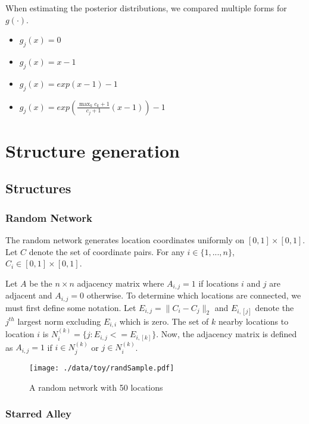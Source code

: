 \documentclass[11pt]{article}
\begin{document}
When estimating the posterior distributions, we compared multiple
forms for $g(\cdot)$.
\begin{itemize}
  \item $g_j(x) = 0$
  \item $g_j(x) = x - 1$
  \item $g_j(x) = exp(x - 1) - 1$
  \item $g_j(x) = exp(\frac{\max_k c_k+1}{c_j + 1}(x - 1)) - 1$
\end{itemize}


\section{Structure generation}
\label{sec-3}

\subsection{Structures}
\label{sec-3-1}

\subsubsection{Random Network}
\label{sec-3-1-1}

The random network generates location coordinates uniformly on $[0,1]
\times [0,1]$.  Let $C$ denote the set of coordinate pairs.  For any
$i \in \lbrace 1,...,n \rbrace$, $C_{i} \in [0,1] \times [0,1]$.

Let $A$ be the $n \times n$ adjacency matrix where $A_{i,j} = 1$ if
locations $i$ and $j$ are adjacent and $A_{i,j} = 0$ otherwise.  To
determine which locations are connected, we must first define some
notation.  Let $E_{i,j} = \|C_{i} - C_{j}\|_2$ and $E_{i,[j]}$ denote
the $j^{th}$ largest norm excluding $E_{i,i}$ which is zero.  The set
of $k$ nearby locations to location $i$ is $N^{(k)}_i = \lbrace j :
E_{i,j} <= E_{i,[k]} \rbrace$.  Now, the adjacency matrix is defined
as $A_{i,j} = 1$ if $i \in N_{j}^{(k)}$ or $j \in N_{i}^{(k)}$.


\begin{figure}[htb]
\centering
\texttt{[image: ./data/toy/randSample.pdf]}
\caption{\label{fig:rand25}A random network with 50 locations}
\end{figure}



\subsubsection{Starred Alley}
\label{sec-3-1-2}
\end{document}
